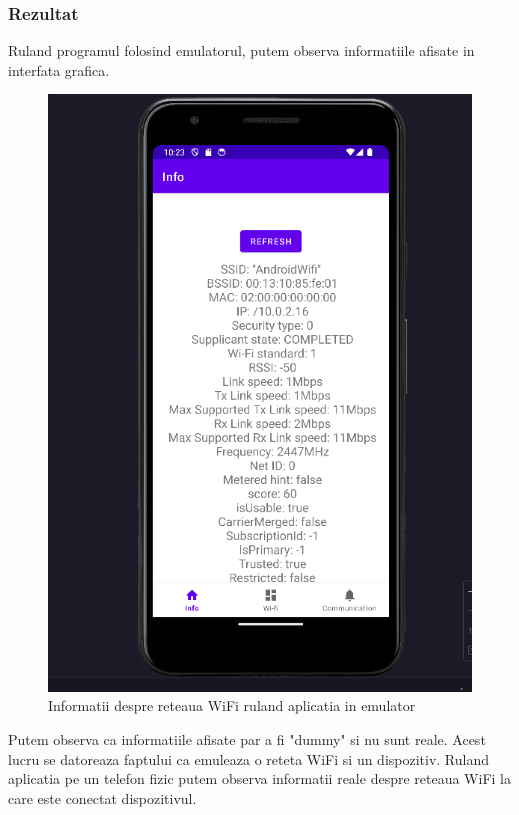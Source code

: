 \subsubsection{Rezultat}

Ruland programul folosind emulatorul, putem observa informatiile afisate in interfata grafica.

\begin{figure}[H]
    \centering
    \includegraphics[width=0.7\linewidth]{figs/wifi_info_emulator.png}
    \caption{Informatii despre reteaua WiFi ruland aplicatia in emulator}
    \label{fig:wifi_info}
\end{figure}

Putem observa ca informatiile afisate par a fi "dummy" si nu sunt reale. Acest lucru se datoreaza faptului ca emuleaza o reteta WiFi si un dispozitiv.
Ruland aplicatia pe un telefon fizic putem observa informatii reale despre reteaua WiFi la care este conectat dispozitivul.
